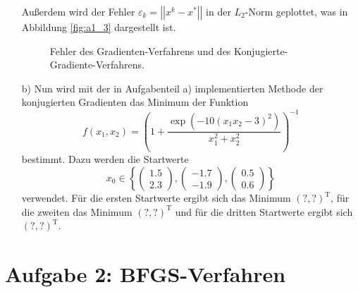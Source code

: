 \begin{itemize}[leftmargin=*]
          \FloatBarrier
          \noindent
          Außerdem wird der Fehler $\varepsilon_k = \left| \left|x^k - x^{*} \right| \right|$ in der $L_2$-Norm
          geplottet, was in Abbildung \ref{fig:a1_3} dargestellt ist.
          \FloatBarrier
          \begin{figure}[H]
              \centering
              \caption{Fehler des Gradienten-Verfahrens und des Konjugierte-Gradiente-Verfahrens.}
              \label{fig:a1_2}
          \end{figure}
          \FloatBarrier
          \noindent
\item[b)] Nun wird mit der in Aufgabenteil a) implementierten Methode der konjugierten Gradienten das Minimum
          der Funktion
          \begin{equation*}
            f\left(x_1, x_2\right) = \left(1 + \frac{\exp \left(-10 \left(x_1 x_2 -3\right)^2\right)}{x_1^2 + x_2^2}\right)^{-1}
          \end{equation*}
          bestimmt. Dazu werden die Startwerte
          \begin{equation*}
            x_0 \in \left\{\begin{pmatrix}
              1.5 \\
              2.3
            \end{pmatrix}, \begin{pmatrix}
              -1.7 \\
              -1.9
            \end{pmatrix}, \begin{pmatrix}
              0.5 \\
              0.6
            \end{pmatrix} \right\}
          \end{equation*}
          verwendet. Für die ersten Startwerte ergibt sich das Minimum $\left(?, ?\right)^{\text{T}}$, für die zweiten das Minimum $\left(?, ?\right)^{\text{T}}$ und für die dritten Startwerte ergibt sich
          $\left(?, ?\right)^{\text{T}}$.
\end{itemize}

\section*{Aufgabe 2: BFGS-Verfahren}


